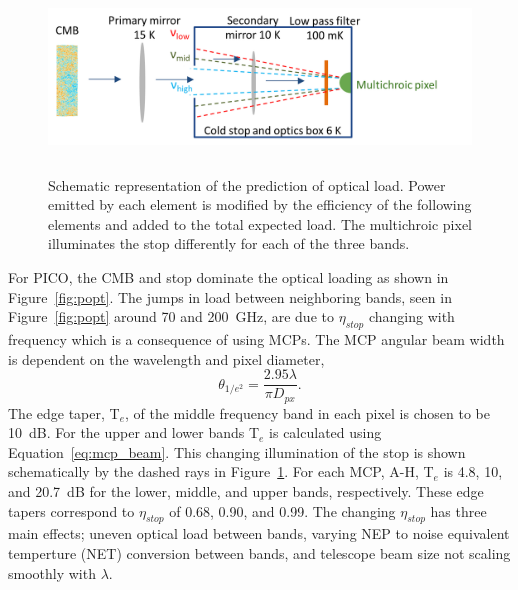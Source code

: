 \documentclass[]{spie}  %
\begin{document}
\begin{figure} [ht]
\begin{center}
\hspace{1cm} \includegraphics[height=5cm]{load_calc_MCP.png}
\end{center}
\caption[load] { \label{fig:load} 
Schematic representation of the prediction of optical load.  Power emitted by each element is modified by the efficiency of the following elements 
and added to the total expected load.  The multichroic pixel illuminates the stop differently for each of the three bands.
}
\end{figure} 
%

For PICO, the CMB and stop dominate the optical loading as shown in Figure~\ref{fig:popt}.  %
The jumps in load between neighboring bands, seen in Figure~\ref{fig:popt} around 70 and 200~GHz, are due to $\eta_{stop}$ changing with frequency 
which is a consequence of using MCPs.  
The MCP angular beam width is dependent on the wavelength and pixel diameter\cite{suzuki2013_thesis},
\begin{equation}
\label{eq:mcp_beam}
\theta_{1/e^2} = \frac{2.95 \lambda}{\pi D_{px}}. 
\end{equation} 
The edge taper, T$_e$, of the middle frequency band in each pixel is chosen to be 10~dB. For the upper and lower bands T$_e$ is calculated using 
Equation~\ref{eq:mcp_beam}. This changing illumination of the stop is shown schematically by the dashed rays in Figure~\ref{fig:load}. 
For each MCP, A-H, T$_e$ is 4.8, 10, and 20.7~dB for the lower, middle, and upper bands, respectively.  These 
edge tapers correspond to $\eta_{stop}$ of 0.68, 0.90, and 0.99.
The changing $\eta_{stop}$ has three main effects; uneven optical load between bands, varying NEP to noise equivalent temperture (NET) conversion 
between bands, and telescope beam size not scaling smoothly with $\lambda$.
\end{document}
